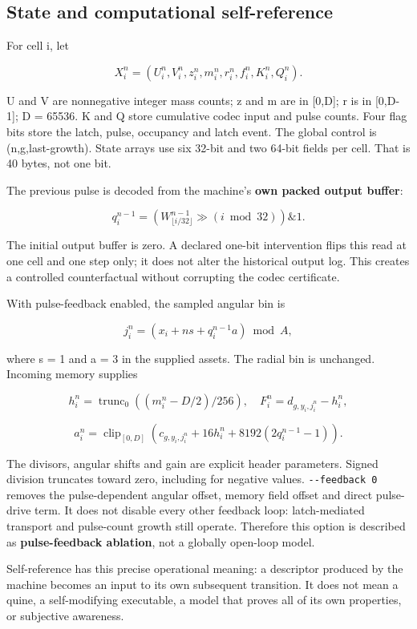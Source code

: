 \documentclass[11pt,a4paper]{article}
\begin{document}
\subsection{State and computational self-reference}\label{state-and-computational-self-reference}

For cell i, let

\[X_i^n=(U_i^n,V_i^n,z_i^n,m_i^n,r_i^n,f_i^n,K_i^n,Q_i^n).\]

U and V are nonnegative integer mass counts; z and m are in {[}0,D{]}; r is in {[}0,D-1{]}; D = 65536. K and Q store cumulative codec input and pulse counts. Four flag bits store the latch, pulse, occupancy and latch event. The global control is (n,g,last-growth). State arrays use six 32-bit and two 64-bit fields per cell. That is 40 bytes, not one bit.

The previous pulse is decoded from the machine's \textbf{own packed output buffer}:

\[q_i^{n-1}=\left(W^{n-1}_{\lfloor i/32\rfloor}\gg(i\bmod32)\right)\mathbin{\&}1.\]

The initial output buffer is zero. A declared one-bit intervention flips this read at one cell and one step only; it does not alter the historical output log. This creates a controlled counterfactual without corrupting the codec certificate.

With pulse-feedback enabled, the sampled angular bin is

\[j_i^n=\left(x_i+n s+q_i^{n-1}a\right)\bmod A,\]

where s = 1 and a = 3 in the supplied assets. The radial bin is unchanged. Incoming memory supplies

\[h_i^n=\operatorname{trunc}_0((m_i^n-D/2)/256),\quad
F_i^n=d_{g,y_i,j_i^n}-h_i^n,\]

\[a_i^n=\operatorname{clip}_{[0,D]}
\left(c_{g,y_i,j_i^n}+16h_i^n+8192(2q_i^{n-1}-1)\right).\]

The divisors, angular shifts and gain are explicit header parameters. Signed division truncates toward zero, including for negative values. \texttt{-\/-feedback\ 0} removes the pulse-dependent angular offset, memory field offset and direct pulse-drive term. It does not disable every other feedback loop: latch-mediated transport and pulse-count growth still operate. Therefore this option is described as \textbf{pulse-feedback ablation}, not a globally open-loop model.

Self-reference has this precise operational meaning: a descriptor produced by the machine becomes an input to its own subsequent transition. It does not mean a quine, a self-modifying executable, a model that proves all of its own properties, or subjective awareness.
\end{document}
